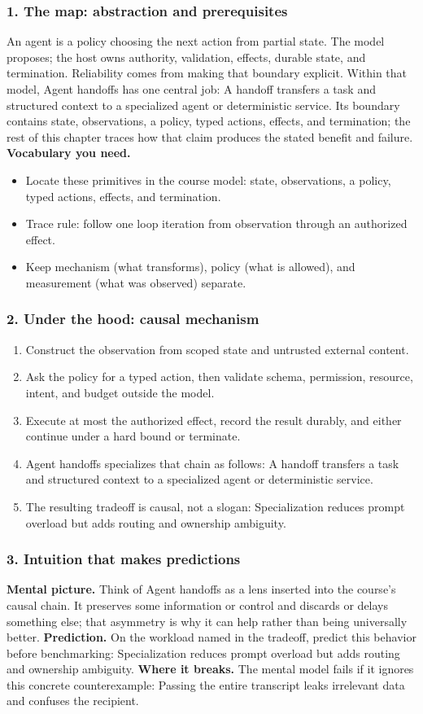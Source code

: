 \subsubsection*{1. The map: abstraction and prerequisites}
An agent is a policy choosing the next action from partial state. The model proposes; the host owns authority, validation, effects, durable state, and termination. Reliability comes from making that boundary explicit.
Within that model, Agent handoffs has one central job: A handoff transfers a task and structured context to a specialized agent or deterministic service. Its boundary contains state, observations, a policy, typed actions, effects, and termination; the rest of this chapter traces how that claim produces the stated benefit and failure.
\textbf{Vocabulary you need.}\begin{itemize}
\item Locate these primitives in the course model: state, observations, a policy, typed actions, effects, and termination.
\item Trace rule: follow one loop iteration from observation through an authorized effect.
\item Keep mechanism (what transforms), policy (what is allowed), and measurement (what was observed) separate.
\end{itemize}
\subsubsection*{2. Under the hood: causal mechanism}\begin{enumerate}
\item Construct the observation from scoped state and untrusted external content.
\item Ask the policy for a typed action, then validate schema, permission, resource, intent, and budget outside the model.
\item Execute at most the authorized effect, record the result durably, and either continue under a hard bound or terminate.
\item Agent handoffs specializes that chain as follows: A handoff transfers a task and structured context to a specialized agent or deterministic service.
\item The resulting tradeoff is causal, not a slogan: Specialization reduces prompt overload but adds routing and ownership ambiguity.
\end{enumerate}
\subsubsection*{3. Intuition that makes predictions}
\textbf{Mental picture.} Think of Agent handoffs as a lens inserted into the course's causal chain. It preserves some information or control and discards or delays something else; that asymmetry is why it can help rather than being universally better.
\textbf{Prediction.} On the workload named in the tradeoff, predict this behavior before benchmarking: Specialization reduces prompt overload but adds routing and ownership ambiguity.
\textbf{Where it breaks.} The mental model fails if it ignores this concrete counterexample: Passing the entire transcript leaks irrelevant data and confuses the recipient.
